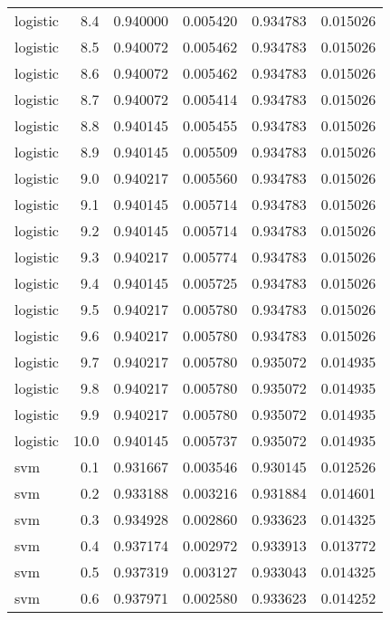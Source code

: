 \begin{tabular}{lrrrrr}
logistic &        8.4 &    0.940000 &   0.005420 &   0.934783 &  0.015026 \\
logistic &        8.5 &    0.940072 &   0.005462 &   0.934783 &  0.015026 \\
logistic &        8.6 &    0.940072 &   0.005462 &   0.934783 &  0.015026 \\
logistic &        8.7 &    0.940072 &   0.005414 &   0.934783 &  0.015026 \\
logistic &        8.8 &    0.940145 &   0.005455 &   0.934783 &  0.015026 \\
logistic &        8.9 &    0.940145 &   0.005509 &   0.934783 &  0.015026 \\
logistic &        9.0 &    0.940217 &   0.005560 &   0.934783 &  0.015026 \\
logistic &        9.1 &    0.940145 &   0.005714 &   0.934783 &  0.015026 \\
logistic &        9.2 &    0.940145 &   0.005714 &   0.934783 &  0.015026 \\
logistic &        9.3 &    0.940217 &   0.005774 &   0.934783 &  0.015026 \\
logistic &        9.4 &    0.940145 &   0.005725 &   0.934783 &  0.015026 \\
logistic &        9.5 &    0.940217 &   0.005780 &   0.934783 &  0.015026 \\
logistic &        9.6 &    0.940217 &   0.005780 &   0.934783 &  0.015026 \\
logistic &        9.7 &    0.940217 &   0.005780 &   0.935072 &  0.014935 \\
logistic &        9.8 &    0.940217 &   0.005780 &   0.935072 &  0.014935 \\
logistic &        9.9 &    0.940217 &   0.005780 &   0.935072 &  0.014935 \\
logistic &       10.0 &    0.940145 &   0.005737 &   0.935072 &  0.014935 \\
     svm &        0.1 &    0.931667 &   0.003546 &   0.930145 &  0.012526 \\
     svm &        0.2 &    0.933188 &   0.003216 &   0.931884 &  0.014601 \\
     svm &        0.3 &    0.934928 &   0.002860 &   0.933623 &  0.014325 \\
     svm &        0.4 &    0.937174 &   0.002972 &   0.933913 &  0.013772 \\
     svm &        0.5 &    0.937319 &   0.003127 &   0.933043 &  0.014325 \\
     svm &        0.6 &    0.937971 &   0.002580 &   0.933623 &  0.014252 \\

\end{tabular}
